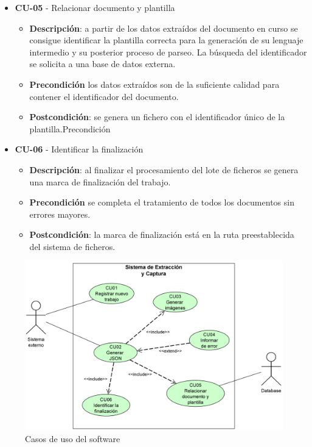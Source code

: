 \begin{itemize}
\item \textbf{CU-05} - Relacionar documento y plantilla
	\begin{itemize}
		\item \textbf{Descripción}: a partir de los datos extraídos del documento en curso se consigue identificar la plantilla correcta para la generación de su lenguaje intermedio y su posterior proceso de parseo. La búsqueda del identificador se solicita a una base de datos externa.
		\item \textbf{Precondición} los datos extraídos son de la suficiente calidad para contener el identificador del documento.
		\item \textbf{Postcondición}: se genera un fichero con el identificador único de la plantilla.Precondición
\end{itemize}
\item \textbf{CU-06} - Identificar la finalización
	\begin{itemize}
		\item \textbf{Descripción}: al finalizar el procesamiento del lote de ficheros se genera una marca de finalización del trabajo.
		\item \textbf{Precondición} se completa el tratamiento de todos los documentos sin errores mayores.
		\item \textbf{Postcondición}: la marca de finalización está en la ruta preestablecida del sistema de ficheros.
\end{itemize}

\end{itemize}

\begin{figure}[hp!]
	\centering
	\includegraphics[width=1.0\textwidth]{imaxes/g-analisis/casos-uso.png}
	\caption{Casos de uso del software}
	\label{fig:casos-de-uso}
\end{figure}

